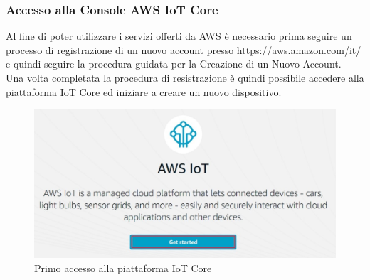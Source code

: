 \subsubsection{Accesso alla Console AWS IoT Core}
Al fine di poter utilizzare i servizi offerti da AWS è necessario prima seguire un processo di registrazione di un nuovo account presso \url{https://aws.amazon.com/it/} e quindi seguire la procedura guidata per la Creazione di un Nuovo Account. \\
Una volta completata la procedura di resistrazione è quindi possibile accedere alla piattaforma IoT Core ed iniziare a creare un nuovo dispositivo.
\begin{figure}
	\begin{center}
		\includegraphics[width=0.9\columnwidth]{images/_1}
	\end{center}
	\caption{Primo accesso alla piattaforma IoT Core}
	\label{fig:_1}
\end{figure}


